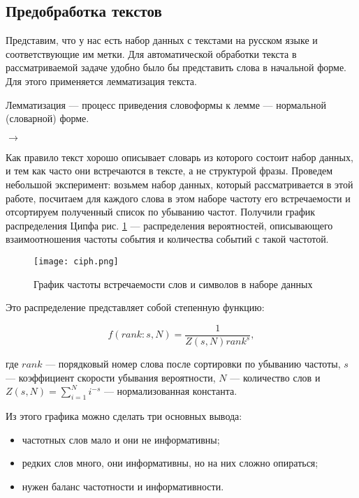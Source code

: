 \subsection{Предобработка текстов}

Представим, что у нас есть набор данных с текстами на русском языке и соответствующие им метки. Для автоматической обработки текста в рассматриваемой задаче удобно было бы представить слова в начальной форме. Для этого применяется лемматизация текста.

\begin{definition}
 Лемматизация --- процесс приведения словоформы к лемме --- нормальной (словарной) форме.
\end{definition}

\bigskip
{} $\to$ 

\bigskip
Как правило текст хорошо описывает словарь из которого состоит набор данных, и тем как часто они встречаются в тексте, а не структурой фразы. Проведем небольшой эксперимент: возьмем набор данных, который рассматривается в этой работе, посчитаем для каждого слова в этом наборе частоту его встречаемости и отсортируем полученный список по убыванию частот. Получили график распределения Ципфа рис. \ref{fig:ciph} --- распределения вероятностей, описывающего взаимоотношения частоты события и количества событий с такой частотой.

\begin{figure}[ht]
    \centering
    \texttt{[image: ciph.png]}
    \caption{График частоты встречаемости слов и символов в наборе данных}
    \label{fig:ciph}
\end{figure}

\bigskip\noindent
Это распределение представляет собой степенную функцию:

\begin{equation*}
 f(rank:s,N) = \frac{1}{Z(s,N)rank^s},
\end{equation*}

\bigskip
где $rank$ --- порядковый номер слова после сортировки по убыванию частоты, $s$ --- коэффициент скорости
убывания вероятности, $N$ --- количество слов и $Z(s,N)= \sum_{i=1}^N i^{-s}$ --- нормализованная константа.

\bigskip\noindent
Из этого графика можно сделать три основных вывода:

\bigskip
\begin{itemize}
 \item частотных слов мало и они не информативны;
 \item редких слов много, они информативны, но на них сложно опираться;
 \item нужен баланс частотности и информативности.
\end{itemize}

